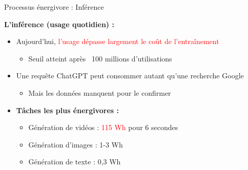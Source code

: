 \begin{frame}{Processus énergivore : Inférence}

\textbf{L'inférence (usage quotidien) :}

\vspace{0.3cm}

\begin{itemize}
    \item<+-> Aujourd'hui, \textcolor{red}{l'usage dépasse largement le coût de l'entraînement}
        \begin{itemize}
            \item Seuil atteint après ~100 millions d'utilisations
        \end{itemize}

    \vspace{0.2cm}
    \item<+-> Une requête ChatGPT peut consommer autant qu'une recherche Google
        \begin{itemize}
            \item Mais les données manquent pour le confirmer
        \end{itemize}

    \vspace{0.2cm}
    \item<+-> \textbf{Tâches les plus énergivores :}
        \begin{itemize}
            \item Génération de vidéos : \textcolor{red}{115 Wh} pour 6 secondes
            \item Génération d'images : 1-3 Wh
            \item Génération de texte : 0,3 Wh
        \end{itemize}
\end{itemize}

\end{frame}

